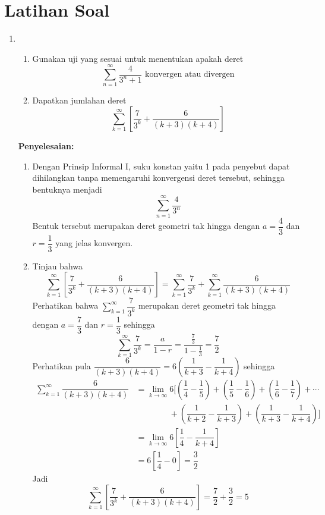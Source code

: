 \documentclass{article}
\begin{document}
\section{Latihan Soal}
\begin{enumerate}
	\item \begin{enumerate}
		\item Gunakan uji yang sesuai untuk menentukan apakah deret
	$$ \sum_{n=1}^\infty \dfrac{4}{3^n+1} \text{ konvergen atau divergen} $$
		\item Dapatkan jumlahan deret 
		$$ \sum_{k=1}^\infty \left[\dfrac{7}{3^k}+\dfrac{6}{(k+3)(k+4)}\right] $$
	\end{enumerate}
	\textbf{Penyelesaian:}
	\begin{enumerate}
		\item Dengan Prinsip Informal I, suku konstan yaitu 1 pada penyebut dapat dihilangkan tanpa memengaruhi konvergensi deret tersebut, sehingga bentuknya menjadi 
		$$ \sum_{n=1}^\infty \dfrac{4}{3^n} $$
		Bentuk tersebut merupakan deret geometri tak hingga dengan $a=\dfrac{4}{3}$ dan $r=\dfrac{1}{3}$ yang jelas konvergen.
		\item Tinjau bahwa 
		$$ \sum_{k=1}^\infty \left[\dfrac{7}{3^k}+\dfrac{6}{(k+3)(k+4)}\right] = \sum_{k=1}^\infty \dfrac{7}{3^k}+\sum_{k=1}^\infty \dfrac{6}{(k+3)(k+4)}  $$
		Perhatikan bahwa $\displaystyle \sum_{k=1}^\infty \dfrac{7}{3^k} $ merupakan deret geometri tak hingga dengan $a=\dfrac{7}{3}$ dan $r=\dfrac{1}{3}$ sehingga 
		$$ \sum_{k=1}^\infty \dfrac{7}{3^k} = \dfrac{a}{1-r} = \dfrac{\frac{7}{3}}{1-\frac{1}{3}} = \dfrac{7}{2} $$
		Perhatikan pula $\dfrac{6}{(k+3)(k+4)}=6\left(\dfrac{1}{k+3}-\dfrac{1}{k+4}\right)$ sehingga 
		\begin{align*}
		\sum_{k=1}^\infty \dfrac{6}{(k+3)(k+4)} &= \lim_{k\rightarrow \infty} 6\bigg[\left(\dfrac{1}{4}-\dfrac{1}{5}\right)+\left(\dfrac{1}{5}-\dfrac{1}{6}\right)+\left(\dfrac{1}{6}-\dfrac{1}{7}\right)+\cdots \\
		&\qquad \qquad +\left(\dfrac{1}{k+2}-\dfrac{1}{k+3}\right)+\left(\dfrac{1}{k+3}-\dfrac{1}{k+4}\right)\bigg]\\
		&= \lim_{k\rightarrow \infty} 6 \left[\dfrac{1}{4}-\dfrac{1}{k+4}\right]\\
		&= 6\left[\dfrac{1}{4}-0\right]=\dfrac{3}{2}
		\end{align*}
		Jadi 
		$$ \sum_{k=1}^\infty \left[\dfrac{7}{3^k}+\dfrac{6}{(k+3)(k+4)}\right] =\dfrac{7}{2} + \dfrac{3}{2} = 5 $$
	\end{enumerate}

\end{enumerate}
\end{document}
